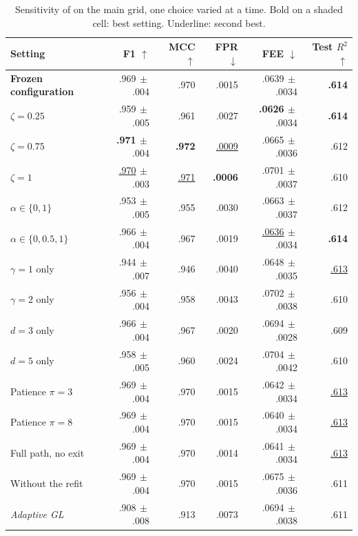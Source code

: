 \begin{table}[t]
\caption{Sensitivity of \sys{} on the main grid, one choice varied at a time. Bold on a shaded cell: best setting. Underline: second best.}
\label{tab:sensitivity}
\centering
\scriptsize
\setlength{\tabcolsep}{1.5pt}
\begin{tabular*}{\columnwidth}{@{\extracolsep{\fill}}lrrrrr@{}}
\toprule
Setting & F1 $\uparrow$ & MCC $\uparrow$ & FPR $\downarrow$ & FEE $\downarrow$ & Test $R^2$ $\uparrow$\\
\midrule
\textbf{Frozen configuration} & .969{\tiny$\,\pm$.004} & .970 & .0015 & .0639{\tiny$\,\pm$.0034} & \cellcolor{best}\textbf{.614}\\
$\zeta=0.25$ & .959{\tiny$\,\pm$.005} & .961 & .0027 & \cellcolor{best}\textbf{.0626}{\tiny$\,\pm$.0034} & \cellcolor{best}\textbf{.614}\\
$\zeta=0.75$ & \cellcolor{best}\textbf{.971}{\tiny$\,\pm$.004} & \cellcolor{best}\textbf{.972} & \underline{.0009} & .0665{\tiny$\,\pm$.0036} & .612\\
$\zeta=1$ & \underline{.970}{\tiny$\,\pm$.003} & \underline{.971} & \cellcolor{best}\textbf{.0006} & .0701{\tiny$\,\pm$.0037} & .610\\
$\alpha\in\{0,1\}$ & .953{\tiny$\,\pm$.005} & .955 & .0030 & .0663{\tiny$\,\pm$.0037} & .612\\
$\alpha\in\{0,0.5,1\}$ & .966{\tiny$\,\pm$.004} & .967 & .0019 & \underline{.0636}{\tiny$\,\pm$.0034} & \cellcolor{best}\textbf{.614}\\
$\gamma=1$ only & .944{\tiny$\,\pm$.007} & .946 & .0040 & .0648{\tiny$\,\pm$.0035} & \underline{.613}\\
$\gamma=2$ only & .956{\tiny$\,\pm$.004} & .958 & .0043 & .0702{\tiny$\,\pm$.0038} & .610\\
$d=3$ only & .966{\tiny$\,\pm$.004} & .967 & .0020 & .0694{\tiny$\,\pm$.0028} & .609\\
$d=5$ only & .958{\tiny$\,\pm$.005} & .960 & .0024 & .0704{\tiny$\,\pm$.0042} & .610\\
Patience $\pi=3$ & .969{\tiny$\,\pm$.004} & .970 & .0015 & .0642{\tiny$\,\pm$.0034} & \underline{.613}\\
Patience $\pi=8$ & .969{\tiny$\,\pm$.004} & .970 & .0015 & .0640{\tiny$\,\pm$.0034} & \underline{.613}\\
Full path, no exit & .969{\tiny$\,\pm$.004} & .970 & .0014 & .0641{\tiny$\,\pm$.0034} & \underline{.613}\\
Without the refit & .969{\tiny$\,\pm$.004} & .970 & .0015 & .0675{\tiny$\,\pm$.0036} & .611\\
\midrule
\textit{Adaptive GL} & .908{\tiny$\,\pm$.008} & .913 & .0073 & .0694{\tiny$\,\pm$.0038} & .611\\
\bottomrule
\end{tabular*}
\end{table}
